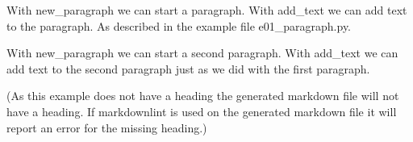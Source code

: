 \documentclass[a4paper]{report}
\begin{document}
With new\_paragraph we can start a paragraph. With add\_text we can add text to the paragraph. As described in the example file e01\_paragraph.py.

With new\_paragraph we can start a second paragraph. With add\_text we can add text to the second paragraph just as we did with the first paragraph.

(As this example does not have a heading the generated markdown file will not have a heading. If markdownlint is used on the generated markdown file it will report an error for the missing heading.)
\end{document}
